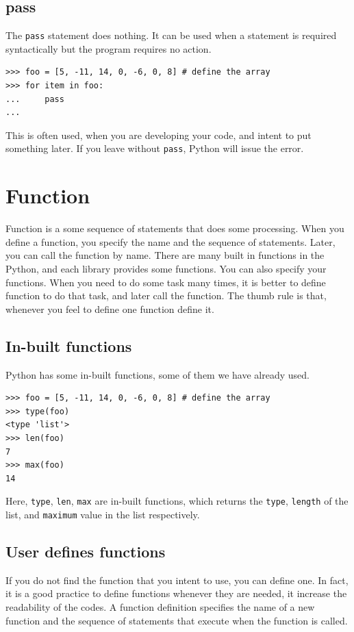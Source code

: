 \documentclass[10pt]{book}
\begin{document}
{\subsection{pass}
The \verb"pass" statement does nothing. It can be used when a statement is required syntactically but the program requires no action. 
\beforeverb
\begin{verbatim}
>>> foo = [5, -11, 14, 0, -6, 0, 8] # define the array
>>> for item in foo:
...     pass
... 
\end{verbatim}
\afterverb
This is often used, when you are developing your code, and intent to put something later. If you leave without \verb"pass", Python will issue the error.

\section{Function}
Function is a some sequence of statements that does some processing. When you define a function, you specify the name and the sequence of statements.  Later, you can call the function by name. There are many built in functions in the Python, and each library provides some functions. You can also specify your functions. When you need to do some task many times, it is better to define function to do that task, and later call the function. The thumb rule is that, whenever you feel to define one function define it.

\subsection{In-built functions}
Python has some in-built functions, some of them we have already used. 
\beforeverb
\begin{verbatim}
>>> foo = [5, -11, 14, 0, -6, 0, 8] # define the array
>>> type(foo)
<type 'list'>
>>> len(foo)
7
>>> max(foo)
14
\end{verbatim}
\afterverb
Here, \verb"type", \verb"len", \verb"max" are in-built functions, which returns the {\tt type}, {\tt length} of the list, and {\tt maximum} value in the list respectively. 

\subsection{User defines functions}
If you do not find the function that you intent to use, you can define one. In fact, it is a good practice to define functions whenever they are needed, it increase the readability of the codes. A function definition specifies the name of a new function and the sequence of statements that execute when the function is called.

}
\end{document}
